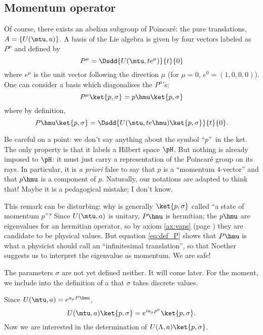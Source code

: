 \subsection{Momentum operator}

Of course, there exists an abelian subgroup of Poincaré: the pure translations, $A=\{U(\mtu,a)\}$. A basis of the Lie algebra is given by four vectors labeled as $P^{\mu}$ and defined by 
\[
P^{\mu}=\Dsdd{U(\mtu,te^{\mu})}{t}{0}
\]
 where $e^{\mu}$ is the unit vector following the direction $\mu$ (for $\mu=0$, $e^0=(1,0,0,0)$). One can consider a basis which diagonalises the $P^{\mu}$'s: 
\begin{equation}
  P^{\mu}\ket{p,\sigma}=p\hmu\ket{p,\sigma}
\end{equation}
where by definition,
\begin{equation}\label{eq:def_P}
   P\hmu\ket{p,\sigma}=\Dsdd{U(\mtu,te\hmu)\ket{p,\sigma}}{t}{0}.
\end{equation}

\begin{remark}
Be careful on a point: we don't say anything about the symbol ``$p$''\ in the ket. The only property is that it labels a Hilbert space $\pH$. But nothing is already imposed to $\pH$: it must just carry a representation of the Poincaré group on its rays. In particular, it is \emph{a priori} false to say that $p$ is a ``momentum $4$-vector'' and that $p\hmu$ is a component of $p$. Naturally, our notations are adapted to think that! Maybe it is a pedagogical mistake; I don't know. 
\end{remark}

This remark can be disturbing: why is generally $\ket{p,\sigma}$ called ``a state of momentum $p$''? Since $U(\mtu,a)$ is unitary, $P\hmu$ is hermitian; the $p\hmu$ are eigenvalues for an hermitian operator, so by axiom \ref{ax:vaps} (page \pageref{pg:axiomes}) they are candidate to be physical values. But equation \eqref{eq:def_P} shows that $P\hmu$ is what a physicist should call an ``infinitesimal translation'', so that Noether suggests us to interpret the eigenvalue as momentum. We are safe!

The parameters $\sigma$ are not yet defined neither. It will come later. For the moment, we include into the definition of a  that $\sigma$ takes discrete values.
 
 Since $U(\mtu,a)=e^{a_{\mu} P\hmu}$,
\[
   U(\mtu,a)\ket{p,\sigma}=e^{ia_{\mu} p^{\mu}}\ket{p,\sigma}.
\]
Now we are interested in the determination of $U(\Lambda,a)\ket{p,\sigma}$.


